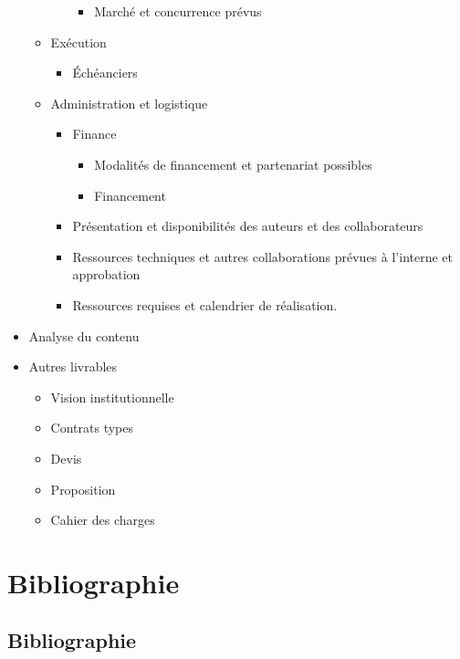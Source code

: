 \begin{frame}[allowframebreaks]
\begin{itemize}
\begin{itemize}
\begin{itemize}
										\begin{itemize}
										\item Marché et concurrence prévus
										\end{itemize}
									\end{itemize}
								\item Exécution
									\begin{itemize}
									\item Échéanciers
									\end{itemize}
								\item Administration et logistique
									\begin{itemize}
									\item Finance
										\begin{itemize}
										\item Modalités de financement et partenariat possibles
										\item Financement
										\end{itemize}
									\item Présentation et disponibilités des auteurs et des collaborateurs
									\item Ressources techniques et autres collaborations prévues à l’interne et approbation
									\item Ressources requises et calendrier de réalisation.
									\end{itemize}
								\end{itemize}
							\item Analyse du contenu
							\item Autres livrables
								\begin{itemize}
								\item Vision institutionnelle
								\item Contrats types
								\item Devis
								\item Proposition
								\item Cahier des charges 
								\end{itemize}
						\end{itemize}
						
					\end{frame}


\section{Bibliographie}
\subsection{Bibliographie}


